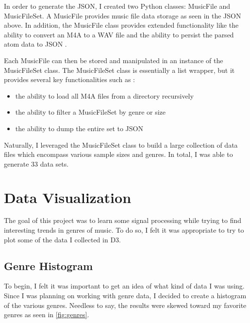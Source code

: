 \documentclass[journal]{vgtc}                %
\begin{document}
In order to generate the JSON, I created two Python classes: MusicFile and
MusicFileSet. A MusicFile provides music file data storage as seen in the JSON
above. In addition, the MusicFile class provides extended functionality like
the ability to convert an M4A to a WAV file and the ability to persist the
parsed atom data to JSON \cite{Grifski:2019:MusicFile}.

Each MusicFile can then be stored and manipulated in an instance of the
MusicFileSet class. The MusicFileSet class is essentially a list wrapper, but
it provides several key functionalities such as \cite{Grifski:2019:MusicFileSet}:

\begin{itemize}
  \item the ability to load all M4A files from a directory recursively
  \item the ability to filter a MusicFileSet by genre or size
  \item the ability to dump the entire set to JSON
\end{itemize}

Naturally, I leveraged the MusicFileSet class to build a large collection of
data files which encompass various sample sizes and genres. In total, I was
able to generate 33 data sets.

\section{Data Visualization}

The goal of this project was to learn some signal processing while trying to
find interesting trends in genres of music. To do so, I felt it was appropriate
to try to plot some of the data I collected in D3.

\subsection{Genre Histogram}

To begin, I felt it was important to get an idea of what kind of data I was
using. Since I was planning on working with genre data, I decided to create
a histogram of the various genres. Needless to say, the results were skewed
toward my favorite genres as seen in \autoref{fig:genres}.
\end{document}
